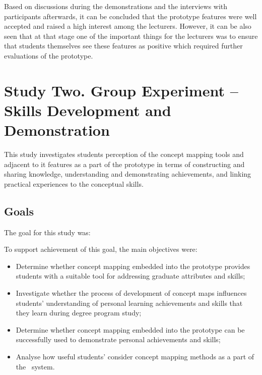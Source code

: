 Based on discussions during the demonstrations and the interviews with
participants afterwards, it can be concluded that the prototype features were
well accepted and raised a high interest among the lecturers. However, it can be
also seen that at that stage one of the important things for the lecturers was
to ensure that students themselves see these features as positive which
required further evaluations of the prototype.

\section[Study Two. Group Experiment -- \LLLc Skills Development]{Study Two.
Group Experiment -- \LLLc Skills Development and Demonstration}
\label{sec:two}

This study investigates students perception of the concept mapping tools and
adjacent to it features as a part of the prototype in terms of constructing
and sharing knowledge, understanding and demonstrating achievements, and linking
practical experiences to the conceptual skills.

\subsection{Goals}
The goal for this study was:


To support achievement of this goal, the main objectives were:

\begin{itemize}
  \item Determine whether concept mapping embedded into the prototype provides
  students with a suitable tool for addressing graduate attributes and \LLLs
  skills;
  \item Investigate whether the process of development of concept maps
  influences students' understanding of personal learning achievements and
  skills that they learn during degree program study;
  \item Determine whether concept mapping embedded into the prototype can be
  successfully used to demonstrate personal achievements and skills;
  \item Analyse how useful students' consider concept mapping methods as a part
  of the \ep~system.
\end{itemize}

